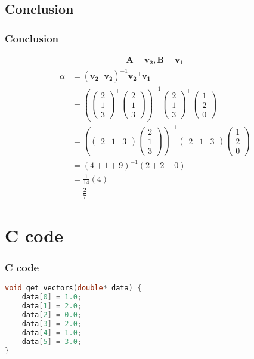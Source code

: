 \documentclass{beamer}
\providecommand{\brak}[1]{\ensuremath{\left(#1\right)}}
\theoremstyle{remark}
\newcommand{\myvec}[1]{\ensuremath{\begin{pmatrix}#1\end{pmatrix}}}
\let\vec\mathbf
\numberwithin{equation}{section}
\begin{document}
\subsection{Conclusion}
\begin{frame}
\frametitle{Conclusion}
\begin{align}
     \vec{A}=\vec{v_2},\vec{B}=\vec{v_1}
     \end{align}
     \begin{align}
\alpha&=\brak{\vec{v_2}^\top\vec{v_2}}^{-1}\vec{v_2}^\top\vec{v_1} \\
    &= \brak{\myvec{2\\1\\3}^\top\myvec{2\\1\\3}}^{-1}\myvec{2\\1\\3}^\top\myvec{1\\2\\0} \\
     &= \brak{\myvec{2&1&3}\myvec{2\\1\\3}}^{-1}\myvec{2&1&3}\myvec{1\\2\\0} \\
     &=\brak{4+1+9}^{-1}\brak{2+2+0}\\
     &=\frac{1}{14}\brak{4}\\
     &=\frac{2}{7}
 \end{align}
 \end{frame}
 \section{C code}
\begin{frame}[fragile]
\frametitle{C code }
\begin{lstlisting}[language=C]
void get_vectors(double* data) {
    data[0] = 1.0;
    data[1] = 2.0;
    data[2] = 0.0;
    data[3] = 2.0;
    data[4] = 1.0;
    data[5] = 3.0;
}
\end{lstlisting}
\end{frame}
\end{document}
